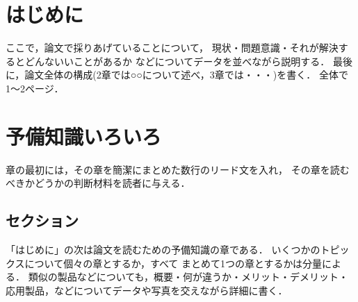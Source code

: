 \documentclass{eithesis}
\begin{document}
\etMakeTitle
\tableofcontents
\clearpage
{}
\pagestyle{fancyplain}
\lhead{\leftmark}  %
\chead{}           %
\rhead{\rightmark} %
\lfoot{}           %
\cfoot{\thepage}   %
\rfoot{}           %

\chapter{はじめに}
ここで，論文で採りあげていることについて，
現状・問題意識・それが解決するとどんないいことがあるか
などについてデータを並べながら説明する．
最後に，論文全体の構成(2章では○○について述べ，3章では・・・)を書く．
全体で1〜2ページ．
\clearpage


\chapter{予備知識いろいろ}
章の最初には，その章を簡潔にまとめた数行のリード文を入れ，
その章を読むべきかどうかの判断材料を読者に与える．

\section{セクション}
「はじめに」の次は論文を読むための予備知識の章である．
いくつかのトピックスについて個々の章とするか，すべて
まとめて1つの章とするかは分量による．
類似の製品などについても，概要・何が違うか・メリット・デメリット・
応用製品，などについてデータや写真を交えながら詳細に書く．
\end{document}
